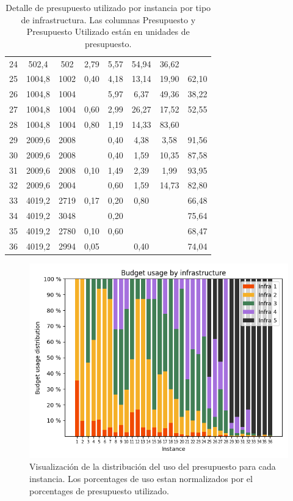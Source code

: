 \documentclass{article}
\begin{document}
\begin{table}
\begin{tabular}{cccccccc}
        24 & 502,4 & 502 & 2,79 & 5,57 & 54,94 & 36,62 &  \\
        25 & 1004,8 & 1002 & 0,40 & 4,18 & 13,14 & 19,90 & 62,10 \\
        26 & 1004,8 & 1004 &  & 5,97 & 6,37 & 49,36 & 38,22 \\
        27 & 1004,8 & 1004 & 0,60 & 2,99 & 26,27 & 17,52 & 52,55 \\
        28 & 1004,8 & 1004 & 0,80 & 1,19 & 14,33 & 83,60 &  \\
        29 & 2009,6 & 2008 &  & 0,40 & 4,38 & 3,58 & 91,56 \\
        30 & 2009,6 & 2008 &  & 0,40 & 1,59 & 10,35 & 87,58 \\
        31 & 2009,6 & 2008 & 0,10 & 1,49 & 2,39 & 1,99 & 93,95 \\
        32 & 2009,6 & 2004 &  & 0,60 & 1,59 & 14,73 & 82,80 \\
        33 & 4019,2 & 2719 & 0,17 & 0,20 & 0,80 &  & 66,48 \\
        34 & 4019,2 & 3048 &  & 0,20 &  &  & 75,64 \\
        35 & 4019,2 & 2780 & 0,10 & 0,60 &  &  & 68,47 \\
        36 & 4019,2 & 2994 & 0,05 &  & 0,40 &  & 74,04 \\
        \bottomrule
    \end{tabular}
      \caption{Detalle de presupuesto utilizado por instancia por tipo de infrastructura. Las columnas Presupuesto y Presupuesto Utilizado están en unidades de presupuesto.} \label{table:sensibilitybudgetusage}
  \end{table}

  \begin{figure}[h!]
    \centering
    \includegraphics[width=12cm]{../resources/budget_use_by_infra.png}
      \caption{Visualización de la distribución del uso del presupuesto para cada instancia. Los porcentages de uso estan normalizados por el porcentages de presupuesto utilizado.}
    \label{fig:sensibilitybudgetusage}
  \end{figure}
\end{document}
